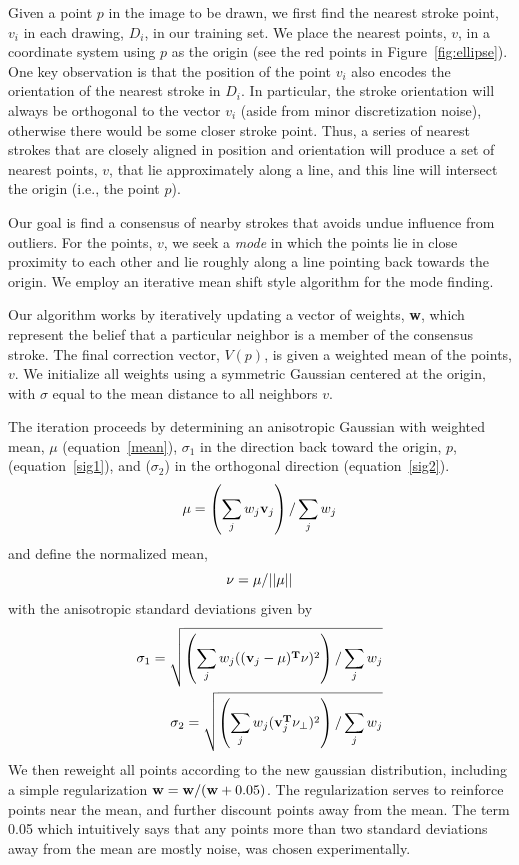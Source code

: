Given a point $p$ in the image to be drawn, we first find the nearest stroke point, $v_i$ in each drawing, $D_i$, in our training set. We place the nearest points, $v$, in a coordinate system using $p$ as the origin (see the red points in Figure~\ref{fig:ellipse}). One key observation is that the position of the point $v_i$ also encodes the orientation of the nearest stroke in $D_i$. In particular, the stroke orientation will always be orthogonal to the vector $v_i$ (aside from minor discretization noise), otherwise there would be some closer stroke point. Thus, a series of nearest strokes that are closely aligned in position and orientation will produce a set of nearest points, $v$, that lie approximately along a line, and this line will intersect the origin (i.e., the point $p$).

Our goal is find a consensus of nearby strokes that avoids undue influence from outliers. For the points, $v$, we seek a {\em mode} in which the points lie in close proximity to each other and lie roughly along a line pointing back towards the origin. We employ an iterative mean shift style algorithm for the mode finding.

Our algorithm works by iteratively updating a vector of weights, {\bf w}, which represent the belief that a particular neighbor is a member of the consensus stroke. The final correction vector, $V(p)$, is given a weighted mean of the points, $v$. We initialize all weights using a symmetric Gaussian centered at the origin, with $\sigma$ equal to the mean distance to all neighbors $v$.


The iteration proceeds by determining an anisotropic Gaussian with weighted mean, $\mu$ (equation~\ref{mean}),
$\sigma_1$ in the direction back toward the origin, $p$, (equation~\ref{sig1}), and ($\sigma_2$) in the orthogonal direction (equation~\ref{sig2}).
\begin{equation}
{\bf \mu} = \left(\sum_j w_j {\bf v}_j\right) / \sum_j w_j  \label{mean}
\end{equation}
and define the normalized mean,
\begin{equation}
{\bf \nu} = \mu/||\mu||
\end{equation}
with the anisotropic standard deviations given by
\begin{eqnarray}
\sigma_1 =  \sqrt{\left(\sum_j w_j (({\bf v}_j-\mu)^{\bf T}\nu)^2\right) / \sum_j w_j} \label{sig1}\\
\sigma_2 =  \sqrt{\left(\sum_j w_j ({\bf v}_j^{\bf T}\nu_\perp)^2\right) / \sum_j w_j} \label{sig2}
\end{eqnarray}
We then reweight all points according to the new gaussian distribution, including a simple regularization ${\bf w} = {\bf w}/ ({\bf w}+0.05)$.  The regularization serves to reinforce points near the mean, and further discount points away from the mean. The term 0.05 which intuitively says that any points more than two standard deviations away from the mean are mostly noise, was chosen experimentally.

